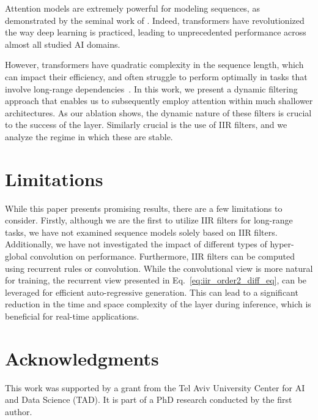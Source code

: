 \documentclass[11pt]{article}
\begin{document}
Attention models are extremely powerful for modeling sequences, as demonstrated by the seminal work of \citet{attention_is_all_u_need}. Indeed, transformers have revolutionized the way deep learning is practiced, leading to unprecedented performance across almost all studied AI domains. 

However, transformers have quadratic complexity in the sequence length, which can impact their efficiency, and often struggle to perform optimally in tasks that involve long-range dependencies~\cite{tay2020long}. In this work, we present a dynamic filtering approach that enables us to subsequently employ attention within much shallower architectures. As our ablation shows, the dynamic nature of these filters is crucial to the success of the layer. Similarly crucial is the use of IIR filters, and we analyze the regime in which these are stable. 

\section{Limitations}

While this paper presents promising results, there are a few limitations to consider. Firstly, although we are the first to utilize IIR filters for long-range tasks, we have not examined sequence models solely based on IIR filters. Additionally, we have not investigated the impact of different types of hyper-global convolution on performance. Furthermore, IIR filters can be computed using recurrent rules or convolution. While the convolutional view is more natural for training, the recurrent view presented in Eq.~\ref{eq:iir_order2_diff_eq}, can be leveraged for efficient auto-regressive generation. This can lead to a significant reduction in the time and space complexity of the layer during inference, which is beneficial for real-time applications.

\section{Acknowledgments}
This work was supported by a grant from the Tel Aviv University Center for AI and Data Science (TAD). It is part of a PhD research conducted by the first author.

\newpage


\newpage
\appendix
\end{document}
